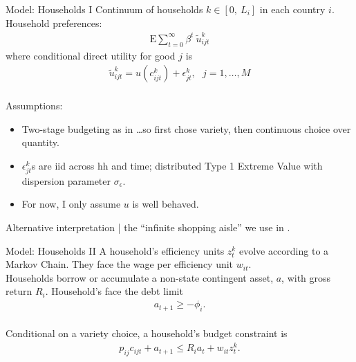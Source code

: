\documentclass[9pt,pdftex,aspectratio=1610]{beamer}
\theoremstyle{definition}
\begin{document}

\begin{frame}[t]{Model: Households I}
\smallskip
Continuum of households $k \in [0, \ L_i]$ in each country $i$. Household preferences:
\begin{align*}
\mathrm{E}\sum_{t = 0}^{\infty} \beta^{t} \ \tilde{u}^k_{ijt}
\end{align*}
where conditional direct utility for good $j$ is
\begin{align*}
\tilde{u}^k_{ijt} =  u(c^k_{ijt}) + \epsilon^k_{jt}, \ \ \ j = 1, \ldots, M
\end{align*}\\
\medskip
Assumptions:
\begin{itemize}
\item Two-stage budgeting as in \citet*{anderson1987ces}\ldots so first chose variety, then continuous choice over quantity.
\smallskip
\item $\epsilon^k_{jt}$s are iid across hh and time; distributed Type 1 Extreme Value with dispersion parameter $\sigma_{\epsilon}$.
\smallskip
\item For now, I only assume $u$ is well behaved.
\end{itemize}
\medskip
Alternative interpretation | the ``infinite shopping aisle'' we use in \citet{p-iq}.
\end{frame}


\begin{frame}[t]{Model: Households II}
\smallskip
A household's efficiency units $z^k_t$ evolve according to a Markov Chain. They face the wage per efficiency unit $w_{it}$.\\
\bigskip
\medskip
Households borrow or accumulate a non-state contingent asset, $a$, with gross return $R_{i}$. Household's face the debt limit
\begin{align*}
a_{t+1} \geq - \phi_{i}.
\end{align*}\\
\bigskip
\medskip
Conditional on a variety choice, a household's budget constraint is
\begin{align*}
p_{ij}c_{ijt} +  a_{t+1} \leq    R_{i} a_{t} + w_{it} z^k_{t}.
\end{align*}
\end{frame}
\end{document}
